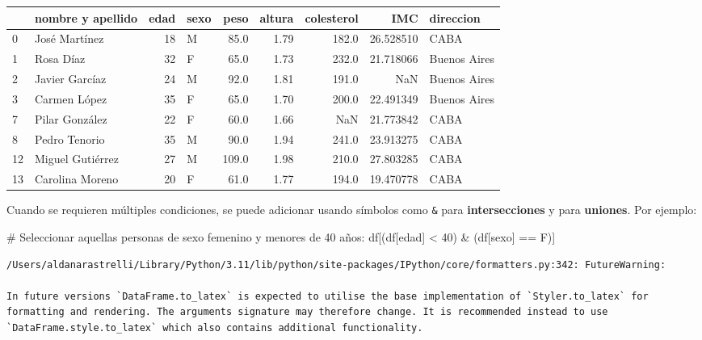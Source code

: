 \documentclass[
  letterpaper,
  DIV=11,
  numbers=noendperiod]{scrreprt}
\newenvironment{Shaded}{\begin{snugshade}}{\end{snugshade}}
\newcommand{\CommentTok}[1]{\textcolor[rgb]{0.37,0.37,0.37}{#1}}
\newcommand{\DecValTok}[1]{\textcolor[rgb]{0.68,0.00,0.00}{#1}}
\newcommand{\NormalTok}[1]{\textcolor[rgb]{0.00,0.23,0.31}{#1}}
\newcommand{\OperatorTok}[1]{\textcolor[rgb]{0.37,0.37,0.37}{#1}}
\newcommand{\StringTok}[1]{\textcolor[rgb]{0.13,0.47,0.30}{#1}}
\begin{document}
\begin{tabular}{llrlrrrrl}
\toprule
{} & nombre y apellido &  edad & sexo &   peso &  altura &  colesterol &        IMC &     direccion \\
\midrule
0  &     José Martínez &    18 &    M &   85.0 &    1.79 &       182.0 &  26.528510 &          CABA \\
1  &         Rosa Díaz &    32 &    F &   65.0 &    1.73 &       232.0 &  21.718066 &  Buenos Aires \\
2  &    Javier Garcíaz &    24 &    M &   92.0 &    1.81 &       191.0 &        NaN &  Buenos Aires \\
3  &      Carmen López &    35 &    F &   65.0 &    1.70 &       200.0 &  22.491349 &  Buenos Aires \\
7  &    Pilar González &    22 &    F &   60.0 &    1.66 &         NaN &  21.773842 &          CABA \\
8  &     Pedro Tenorio &    35 &    M &   90.0 &    1.94 &       241.0 &  23.913275 &          CABA \\
12 &  Miguel Gutiérrez &    27 &    M &  109.0 &    1.98 &       210.0 &  27.803285 &          CABA \\
13 &   Carolina Moreno &    20 &    F &   61.0 &    1.77 &       194.0 &  19.470778 &          CABA \\
\bottomrule
\end{tabular}

Cuando se requieren múltiples condiciones, se puede adicionar usando
símbolos como \texttt{\&} para \textbf{intersecciones} y
\texttt{\textbar{}} para \textbf{uniones}. Por ejemplo:

\begin{Shaded}
\begin{Highlighting}[]
\CommentTok{\# Seleccionar aquellas personas de sexo femenino y menores de 40 años:}
\NormalTok{df[(df[}\StringTok{\textquotesingle{}edad\textquotesingle{}}\NormalTok{] }\OperatorTok{\textless{}} \DecValTok{40}\NormalTok{) }\OperatorTok{\&}\NormalTok{ (df[}\StringTok{\textquotesingle{}sexo\textquotesingle{}}\NormalTok{] }\OperatorTok{==} \StringTok{\textquotesingle{}F\textquotesingle{}}\NormalTok{)]}
\end{Highlighting}
\end{Shaded}

\begin{verbatim}
/Users/aldanarastrelli/Library/Python/3.11/lib/python/site-packages/IPython/core/formatters.py:342: FutureWarning:

In future versions `DataFrame.to_latex` is expected to utilise the base implementation of `Styler.to_latex` for formatting and rendering. The arguments signature may therefore change. It is recommended instead to use `DataFrame.style.to_latex` which also contains additional functionality.
\end{verbatim}
\end{document}
